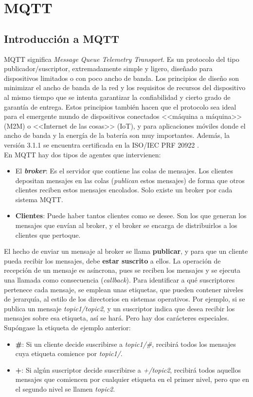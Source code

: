\documentclass[12pt,spanish,listoffigures,listoftables]{tfgetsinf}
\begin{document}
\section{MQTT}

\subsection{Introducción a MQTT}

MQTT significa \textit{Message Queue Telemetry Transport}. Es un protocolo del tipo publicador/suscriptor, extremadamente simple y ligero, diseñado para dispositivos limitados o con poco ancho de banda. Los principios de diseño son minimizar el ancho de banda de la red y los requisitos de recursos del dispositivo al mismo tiempo que se intenta garantizar la confiabilidad y cierto grado de garantía de entrega. Estos principios también hacen que el protocolo sea ideal para el emergente mundo de dispositivos conectados <<máquina a máquina>> (M2M) o <<Internet de las cosas>> (IoT), y para aplicaciones móviles donde el ancho de banda y la energía de la batería son muy importantes. Además, la versión 3.1.1 se encuentra certificada en la ISO/IEC PRF 20922 \cite{MQTTISO}. \\

En MQTT hay dos tipos de agentes que intervienen: 
\begin{itemize}
	\item El \textbf{\textit{broker}}: Es el servidor que contiene las colas de mensajes. Los clientes depositan mensajes en las colas (\textit{publican} estos mensajes) de forma que otros clientes reciben estos mensajes encolados. Solo existe un broker por cada sistema MQTT.
	\item \textbf{Clientes}: Puede haber tantos clientes como se desee. Son los que generan los mensajes que envían al broker, y el broker se encarga de distribuirlos a los clientes que pertoque. 
\end{itemize}

El hecho de enviar un mensaje al broker se llama \textbf{publicar}, y para que un cliente pueda recibir los mensajes, debe \textbf{estar suscrito} a ellos. La operación de recepción de un mensaje es asíncrona, pues se reciben los mensajes y se ejecuta una llamada como consecuencia (\textit{callback}). Para identificar a qué suscriptores pertenece cada mensaje, se emplean unas etiquetas, que pueden contener niveles de jerarquía, al estilo de los directorios en sistemas operativos. Por ejemplo, si se publica un mensaje \textit{topic1/topic2}, y un suscriptor indica que desea recibir los mensajes sobre esa etiqueta, así se hará. Pero hay dos carácteres especiales. Supóngase la etiqueta de ejemplo anterior: 
\begin{itemize}
	\item \textbf{\#}: Si un cliente decide suscribirse a \textit{topic1/\#}, recibirá todos los mensajes cuya etiqueta comience por \textit{topic1/}.
	\item \textbf{+}: Si algún suscriptor decide suscribirse a \textit{+/topic2}, recibirá todos aquellos mensajes que comiencen por cualquier etiqueta en el primer nivel, pero que en el segundo nivel se llamen \textit{topic2}.
\end{itemize} 
\end{document}
